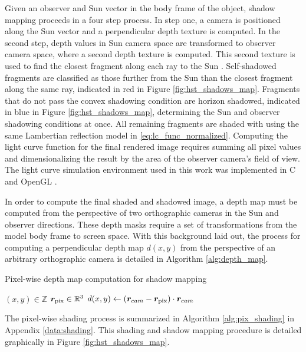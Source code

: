 Given an observer and Sun vector in the body frame of the object, shadow mapping proceeds in a four step process. In step one, a camera is positioned along the Sun vector and a perpendicular depth texture is computed. In the second step, depth values in Sun camera space are transformed to observer camera space, where a second depth texture is computed. This second texture is used to find the closest fragment along each ray to the Sun \cite{brabec2002}. Self-shadowed fragments are classified as those further from the Sun than the closest fragment along the same ray, indicated in red in Figure \ref{fig:hst_shadows_map}. Fragments that do not pass the convex shadowing condition are horizon shadowed, indicated in blue in Figure \ref{fig:hst_shadows_map}, determining the Sun and observer shadowing conditions at once. All remaining fragments are shaded with using the same Lambertian reflection model in \ref{eq:lc_func_normalized}. Computing the light curve function for the final rendered image requires summing all pixel values and dimensionalizing the result by the area of the observer camera's field of view. The light curve simulation environment used in this work was implemented in C and OpenGL \cite{raylib}.

In order to compute the final shaded and shadowed image, a depth map must be computed from the perspective of two orthographic cameras in the Sun and observer directions. These depth masks require a set of transformations from the model body frame to screen space. With this background laid out, the process for computing a perpendicular depth map $d(x,y)$ from the perspective of an arbitrary orthographic camera is detailed in Algorithm \ref{alg:depth_map}.

\begin{algorithm}
  \caption{Pixel-wise depth map computation for shadow mapping} \label{alg:depth_map}
  \begin{algorithmic}
    \State $(x, y) \in \mathbb{Z}$ 
    \State $\bm{r}_\mathrm{pix} \in \mathbb{R}^3$ 
    \State $d(x, y) \gets \left( \bm{r}_{cam} - \bm{r}_\mathrm{pix} \right) \cdot \bm{r}_{cam}$ 
  \end{algorithmic}
\end{algorithm}

The pixel-wise shading process is summarized in Algorithm \ref{alg:pix_shading} in Appendix \ref{data:shading}. This shading and shadow mapping procedure is detailed graphically in Figure \ref{fig:hst_shadows_map}.

